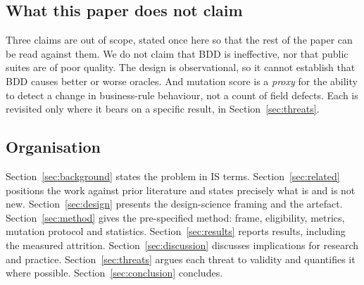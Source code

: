 \subsection{What this paper does not claim}

Three claims are out of scope, stated once here so that the rest of the paper can be read against
them. We do not claim that BDD is ineffective, nor that public suites are of poor quality. The design
is observational, so it cannot establish that BDD causes better or worse oracles. And mutation score is
a \emph{proxy} for the ability to detect a change in business-rule behaviour, not a count of field
defects. Each is revisited only where it bears on a specific result, in
Section~\ref{sec:threats}.

\subsection{Organisation}

Section~\ref{sec:background} states the problem in IS terms. Section~\ref{sec:related} positions the
work against prior literature and states precisely what is and is not new.
Section~\ref{sec:design} presents the design-science framing and the artefact.
Section~\ref{sec:method} gives the pre-specified method: frame, eligibility, metrics, mutation
protocol and statistics. Section~\ref{sec:results} reports results, including the measured attrition.
Section~\ref{sec:discussion} discusses implications for research and practice.
Section~\ref{sec:threats} argues each threat to validity and quantifies it where possible.
Section~\ref{sec:conclusion} concludes.

